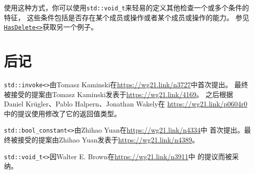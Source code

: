 使用这种方式，你可以使用\texttt{std::void\_t}来轻易的定义其他检查一个或多个条件的特征，
这些条件包括是否存在某个成员或操作或者某个成员或操作的能力。
参见\hyperref[ch30.1.2.2]{\texttt{HasDelete<>}}获取另一个例子。


\section{后记}
\texttt{std::invoke<>}由Tomasz Kaminski在\url{https://wg21.link/n3727}中首次提出。
最终被接受的提案由Tomasz Kaminski发表于\url{https://wg21.link/4169}。
之后根据Daniel Krügler、Pablo Halpern、Jonathan Wakely在
\url{https://wg21.link/p0604r0}中的提议使用修改了它的返回值类型。

\texttt{std::bool\_constant<>}由Zhihao Yuan在\url{https://wg21.link/n4334}中
首次提出。最终被接受的提案由Zhihao Yuan发表于\url{https://wg21.link/n4389}。

\texttt{std::void\_t<>}因Walter E. Brown在\url{https://wg21.link/n3911}中
的提议而被采纳。